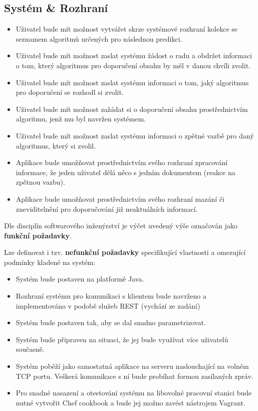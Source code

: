 \documentclass[thesis=M,czech]{FITthesis}[2014/05/07]
\begin{document}
\subsection{Systém \& Rozhraní}

\begin{itemize}
	\item Uživatel bude mít možnost vytvářet skrze systémové rozhraní kolekce se seznamem algoritmů určených pro následnou predikci.
	\item Uživatel bude mít možnost zaslat systému žádost o radu a obdržet informaci o tom, který algoritmus pro doporučení obsahu by měl v danou chvíli zvolit.
	\item Uživatel bude mít možnost zaslat systému informaci o tom, jaký algoritmus pro doporučení se rozhodl si zvolit.
	\item Uživatel bude mít možnost zažádat si o doporučení obsahu prostřednictvím algoritmu, jenž mu byl navržen systémem.
	\item Uživatel bude mít možnost zaslat systému informaci o zpětné vazbě pro daný algoritmus, který si zvolil.
	\item Aplikace bude umožňovat prostřednictvím svého rozhraní zpracování informace, že jeden uživatel dělá něco s jedním dokumentem (reakce na zpětnou vazbu).
	\item Aplikace bude umožňovat prostřednictvím svého rozhraní mazání či zneviditelnění pro doporučování již neaktuálních informací.
\end{itemize}

Dle disciplín softwarového inženýrství je výčet uvedený výše označován jako \textbf{funkční požadavky}.

Lze definovat i tzv. \textbf{nefunkční požadavky} specifikující vlastnosti a omezující podmínky kladené na systém:

\begin{itemize}
	\item Systém bude postaven na platformě Java.
	\item Rozhraní systému pro komunikaci s klientem bude navrženo a implementováno v podobě služeb REST (vychází ze zadání)
	\item Systém bude postaven tak, aby se dal snadno parametrizovat. 
	\item Systém bude připraven na situaci, že jej bude využívat více uživatelů současně.
	\item Systém poběží jako samostatná aplikace na serveru naslouchající na volném TCP portu. Veškerá komunikace s ní bude probíhat formou zasílaných zpráv.
	\item Pro snadné nasazení a otestování systému na libovolné pracovní stanici bude nutné vytvořit Chef cookbook a bude jej možno zavést nástrojem Vagrant.
\end{itemize}
\end{document}
